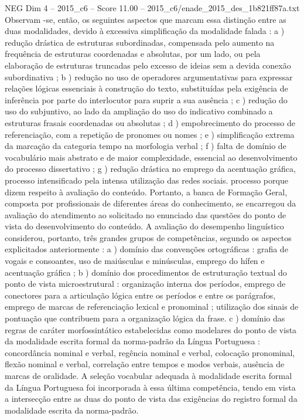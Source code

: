 \begin{textsample}{NEG Dim 4 – 2015\_c6 – Score 11.00 – 2015\_c6/enade\_2015\_des\_1b821ff87a.txt}
Observam -se, então, os seguintes aspectos que marcam essa distinção entre as duas modalidades, devido à excessiva simplificação da modalidade falada : a ) redução drástica de estruturas subordinadas, compensada pelo aumento na frequência de estruturas coordenadas e absolutas, por um lado, ou pela elaboração de estruturas truncadas pelo excesso de ideias sem a devida conexão subordinativa ; b ) redução no uso de operadores argumentativas para expressar relações lógicas essenciais à construção do texto, substituídas pela exigência de inferência por parte do interlocutor para suprir a sua ausência ; c ) redução do uso do subjuntivo, ao lado da ampliação do uso do indicativo combinado a estruturas frasais coordenadas ou absolutas ; d ) empobrecimento do processo de referenciação, com a repetição de pronomes ou nomes ; e ) simplificação extrema da marcação da categoria tempo na morfologia verbal ; f ) falta de domínio de vocabulário mais abstrato e de maior complexidade, essencial ao desenvolvimento do processo dissertativo ; g ) redução drástica no emprego da acentuação gráfica, processo intensificado pela intensa utilização das redes sociais. processo porque dizem respeito à avaliação do conteúdo.
Portanto, a banca de Formação Geral, composta por profissionais de diferentes áreas do conhecimento, se encarregou da avaliação do atendimento ao solicitado no enunciado das questões do ponto de vista do desenvolvimento do conteúdo.
A avaliação do desempenho linguístico considerou, portanto, três grandes grupos de competências, segundo os aspectos explicitados anteriormente : a ) domínio das convenções ortográficas : grafia de vogais e consoantes, uso de maiúsculas e minúsculas, emprego do hífen e acentuação gráfica ; b ) domínio dos procedimentos de estruturação textual do ponto de vista microestrutural : organização interna dos períodos, emprego de conectores para a articulação lógica entre os períodos e entre os parágrafos, emprego de marcas de referenciação lexical e pronominal ; utilização dos sinais de pontuação que contribuem para a organização lógica da frase. c ) domínio das regras de caráter morfossintático estabelecidas como modelares do ponto de vista da modalidade escrita formal da norma-padrão da Língua Portuguesa : concordância nominal e verbal, regência nominal e verbal, colocação pronominal, flexão nominal e verbal, correlação entre tempos e modos verbais, ausência de marcas de oralidade.
A seleção vocabular adequada à modalidade escrita formal da Língua Portuguesa foi incorporada à essa última competência, tendo em vista a intersecção entre as duas do ponto de vista das exigências do registro formal da modalidade escrita da norma-padrão.

\end{textsample}
